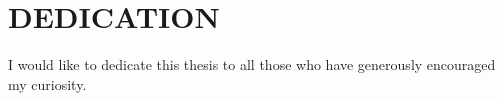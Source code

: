 \chapter*{DEDICATION}

I would like to dedicate this thesis to all those who have generously encouraged my curiosity.
